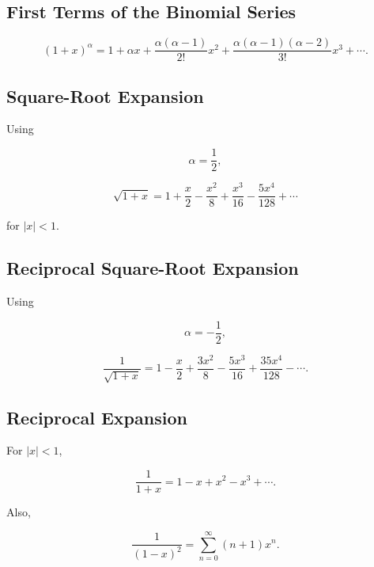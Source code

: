 \subsection{First Terms of the Binomial Series}
\label{subsec:binomial-series-first-terms}

\[
\boxed{
(1+x)^\alpha
=
1
+
\alpha x
+
\frac{
\alpha(\alpha-1)
}{
2!
}
x^2
+
\frac{
\alpha(\alpha-1)(\alpha-2)
}{
3!
}
x^3
+\cdots.
}
\]

\subsection{Square-Root Expansion}
\label{subsec:sqrt-series-reference}

Using

\[
\alpha=\frac12,
\]

\[
\boxed{
\sqrt{1+x}
=
1
+
\frac{x}{2}
-
\frac{x^2}{8}
+
\frac{x^3}{16}
-
\frac{5x^4}{128}
+\cdots
}
\]

for \(|x|<1\).

\subsection{Reciprocal Square-Root Expansion}
\label{subsec:inverse-sqrt-series-reference}

Using

\[
\alpha=-\frac12,
\]

\[
\boxed{
\frac{1}{\sqrt{1+x}}
=
1
-
\frac{x}{2}
+
\frac{3x^2}{8}
-
\frac{5x^3}{16}
+
\frac{35x^4}{128}
-\cdots.
}
\]

\subsection{Reciprocal Expansion}
\label{subsec:reciprocal-series-reference}

For \(|x|<1\),

\[
\boxed{
\frac{1}{1+x}
=
1-x+x^2-x^3+\cdots.
}
\]

Also,

\[
\boxed{
\frac{1}{(1-x)^2}
=
\sum_{n=0}^{\infty}
(n+1)x^n.
}
\]

